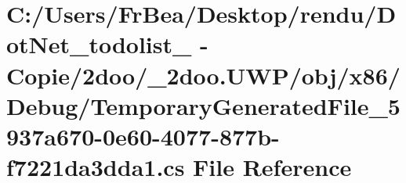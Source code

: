 \hypertarget{_u_w_p_2obj_2x86_2_debug_2_temporary_generated_file__5937a670-0e60-4077-877b-f7221da3dda1_8cs}{
\section{C:/Users/FrBea/Desktop/rendu/DotNet\_\-todolist\_ - Copie/2doo/\_\-2doo.UWP/obj/x86/Debug/TemporaryGeneratedFile\_\-5937a670-0e60-4077-877b-f7221da3dda1.cs File Reference}
\label{_u_w_p_2obj_2x86_2_debug_2_temporary_generated_file__5937a670-0e60-4077-877b-f7221da3dda1_8cs}
}
